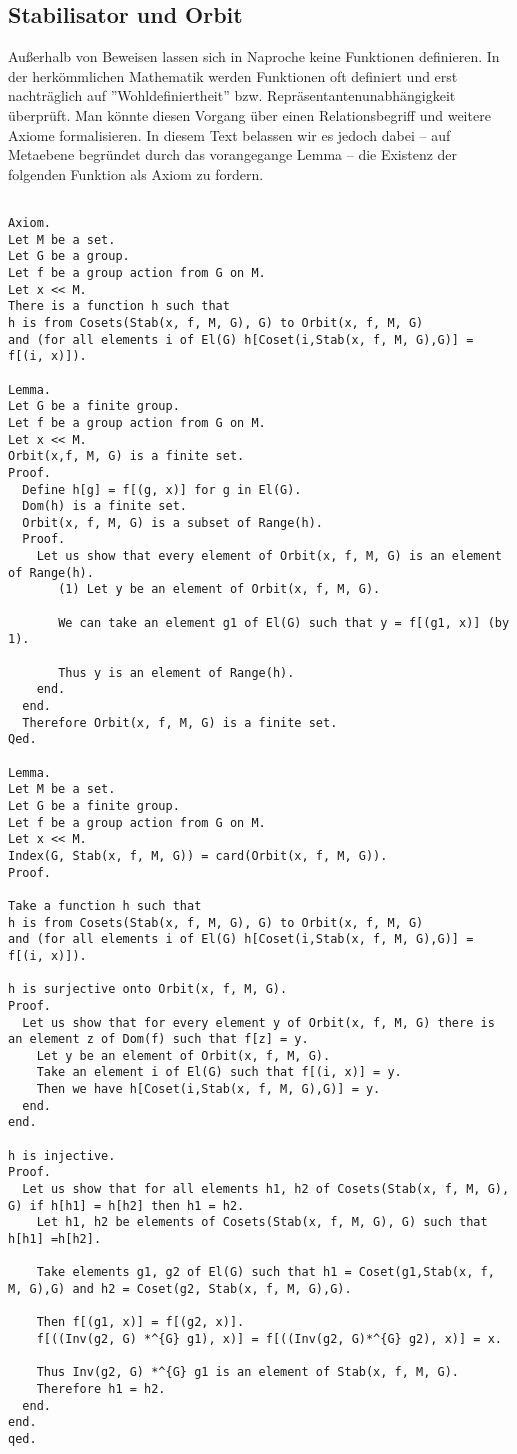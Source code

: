 \documentclass[a4paper,12pt]{scrartcl}
\begin{document}
\subsection{Stabilisator und Orbit}

Außerhalb von Beweisen lassen sich in Naproche keine Funktionen definieren. In der herkömmlichen Mathematik werden Funktionen oft definiert und erst nachträglich auf ''Wohldefiniertheit'' bzw. Repräsentantenunabhängigkeit überprüft.
Man könnte diesen Vorgang über einen Relationsbegriff und weitere Axiome formalisieren. In diesem Text belassen wir es jedoch dabei -- auf Metaebene begründet durch das vorangegange Lemma -- die Existenz der folgenden Funktion als Axiom zu fordern.

\begin{lstlisting}

Axiom.
Let M be a set.
Let G be a group.
Let f be a group action from G on M.
Let x << M.
There is a function h such that
h is from Cosets(Stab(x, f, M, G), G) to Orbit(x, f, M, G)
and (for all elements i of El(G) h[Coset(i,Stab(x, f, M, G),G)] = f[(i, x)]).

Lemma.
Let G be a finite group.
Let f be a group action from G on M.
Let x << M.
Orbit(x,f, M, G) is a finite set.
Proof.
  Define h[g] = f[(g, x)] for g in El(G).
  Dom(h) is a finite set.
  Orbit(x, f, M, G) is a subset of Range(h).
  Proof.
    Let us show that every element of Orbit(x, f, M, G) is an element of Range(h).
       (1) Let y be an element of Orbit(x, f, M, G).

       We can take an element g1 of El(G) such that y = f[(g1, x)] (by 1).

       Thus y is an element of Range(h).
    end.
  end.
  Therefore Orbit(x, f, M, G) is a finite set.
Qed.

Lemma.
Let M be a set.
Let G be a finite group.
Let f be a group action from G on M.
Let x << M.
Index(G, Stab(x, f, M, G)) = card(Orbit(x, f, M, G)).
Proof.

Take a function h such that
h is from Cosets(Stab(x, f, M, G), G) to Orbit(x, f, M, G)
and (for all elements i of El(G) h[Coset(i,Stab(x, f, M, G),G)] = f[(i, x)]).

h is surjective onto Orbit(x, f, M, G).
Proof.
  Let us show that for every element y of Orbit(x, f, M, G) there is an element z of Dom(f) such that f[z] = y.
    Let y be an element of Orbit(x, f, M, G).
    Take an element i of El(G) such that f[(i, x)] = y.
    Then we have h[Coset(i,Stab(x, f, M, G),G)] = y.
  end.
end.

h is injective.
Proof.
  Let us show that for all elements h1, h2 of Cosets(Stab(x, f, M, G), G) if h[h1] = h[h2] then h1 = h2.
    Let h1, h2 be elements of Cosets(Stab(x, f, M, G), G) such that h[h1] =h[h2].
    
    Take elements g1, g2 of El(G) such that h1 = Coset(g1,Stab(x, f, M, G),G) and h2 = Coset(g2, Stab(x, f, M, G),G).
  
    Then f[(g1, x)] = f[(g2, x)].
    f[((Inv(g2, G) *^{G} g1), x)] = f[((Inv(g2, G)*^{G} g2), x)] = x.
    
    Thus Inv(g2, G) *^{G} g1 is an element of Stab(x, f, M, G).
    Therefore h1 = h2.
  end.
end.
qed.
\end{lstlisting}
\end{document}
